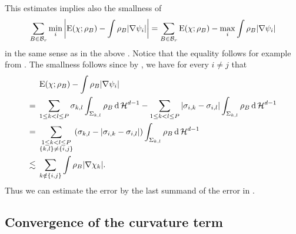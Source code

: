 \begin{remark}
	\label{localization_estimate_weaker}
This estimates implies also the smallness of
\begin{equation*}
	\sum_{ B \in \mathcal{ B }_{ r } }
		\min_{ i }
			\abs{
			\operatorname{E} ( \chi; \rho_{ B } )
			-
			\int
				\rho_{ B }
			\abs{ \nabla \psi_{ i } }
		}
	=
	\sum_{ B \in \mathcal{ B }_{ r } }
		\operatorname{E} ( \chi ; \rho_{ B } )
		-
		\max_{ i }
			\int
				\rho_{ B }
			\abs{ \nabla \psi_{ i } }
\end{equation*}
in the same sense as in the above . Notice that the equality follows for example from . The smallness follows since by , we have for every $ i \neq j $ that
\begin{align*}
	&
	\operatorname{E} ( \chi ; \rho_{ B } ) 
	-
	\int
		\rho_{ B }
	\abs{ \nabla \psi_{ i } }
	\\
	={} &
	\sum_{ 1 \leq k < l \leq P }
		\sigma_{ k , l }
		\int_{ \Sigma_{ k , l } }
			\rho_{ B }
		\dd{ \operatorname{\mathcal{H}}^{ d -1 } }
	-
	\sum_{ 1 \leq k < l \leq P }
		\abs{ \sigma_{ i , k } - \sigma_{ i , l } }
		\int_{ \Sigma_{ k, l } }
			\rho_{ B }
		\dd{ \operatorname{\mathcal{H}}^{ d - 1 } }
	\\
	={} &
	\sum_{ \substack{1 \leq k < l \leq P \\ \{ k, l \} \neq \{ i, j \} } }
		\left(
			\sigma_{ k , l } - \abs{ \sigma_{ i , k } - \sigma_{ i , l } }
		\right)
		\int_{ \Sigma_{ k , l } }
			\rho_{ B }
		\dd{ \operatorname{\mathcal{H}}^{ d - 1 } }
	\\
	\lesssim{} &
	\sum_{ k \notin \{ i, j \} }
		\int
			\rho_{ B }
		\abs{ \nabla \chi_{ k } }.
\end{align*}
Thus we can estimate the error by the last summand of the error in 
.
\end{remark}
\subsection{Convergence of the curvature term}

